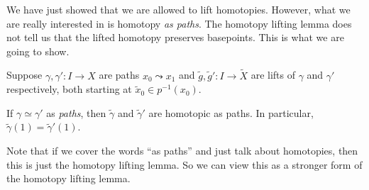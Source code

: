 \documentclass[a4paper]{article}
\begin{document}
We have just showed that we are allowed to lift homotopies. However, what we are really interested in is homotopy \emph{as paths}. The homotopy lifting lemma does not tell us that the lifted homotopy preserves basepoints. This is what we are going to show.

\begin{cor}
  Suppose $\gamma, \gamma': I\to X$ are paths $x_0 \leadsto x_1$ and $\tilde{g}, \tilde{g}': I\to \tilde{X}$ are lifts of $\gamma$ and $\gamma'$ respectively, both starting at $\tilde{x}_0 \in p^{-1}(x_0)$.

  If $\gamma\simeq \gamma'$ as \emph{paths}, then $\tilde{\gamma}$ and $\tilde{\gamma}'$ are homotopic as paths. In particular, $\tilde{\gamma}(1) = \tilde{\gamma}'(1)$.
\end{cor}
Note that if we cover the words ``as paths'' and just talk about homotopies, then this is just the homotopy lifting lemma. So we can view this as a stronger form of the homotopy lifting lemma.
\end{document}
